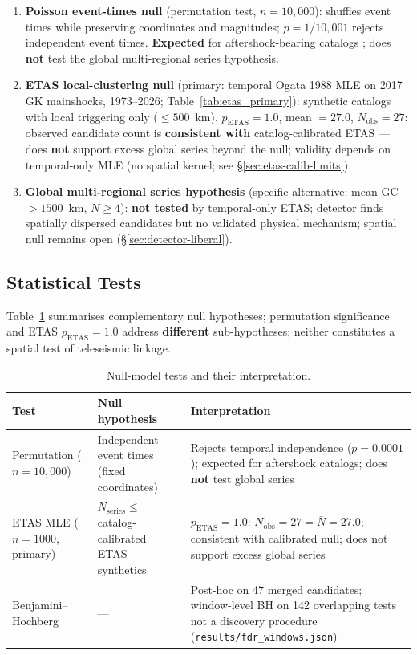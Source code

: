 \documentclass[draft]{agujournal2019}
\begin{document}
\begin{enumerate}
\item \textbf{Poisson event-times null} (permutation test, $n=10{,}000$):
      shuffles event times while preserving coordinates and magnitudes;
      $p = 1/10{,}001$ rejects independent event times.
      \textbf{Expected} for aftershock-bearing catalogs \citep{Ogata1988};
      does \textbf{not} test the global multi-regional series hypothesis.

\item \textbf{ETAS local-clustering null} (primary: temporal Ogata 1988 MLE on
      2017 GK mainshocks, 1973--2026; Table~\ref{tab:etas_primary}):
      synthetic catalogs with local triggering only ($\le 500$~km).
      $p_\mathrm{ETAS}=1.0$, mean $= 27.0$, $N_\mathrm{obs}=27$:
      observed candidate count is \textbf{consistent with} catalog-calibrated
      ETAS --- does \textbf{not} support excess global series beyond the null;
      validity depends on temporal-only MLE (no spatial kernel; see
      \S\ref{sec:etas-calib-limits}).

\item \textbf{Global multi-regional series hypothesis} (specific alternative:
      mean GC $> 1500$~km, $N\ge 4$): \textbf{not tested} by temporal-only ETAS;
      detector finds spatially dispersed candidates but no validated physical
      mechanism; spatial null remains open (§\ref{sec:detector-liberal}).
\end{enumerate}

\subsection{Statistical Tests}
\label{subsec:stat-tests}

Table~\ref{tab:null_tests} summarises complementary null hypotheses;
permutation significance and ETAS $p_\mathrm{ETAS}=1.0$ address \textbf{different}
sub-hypotheses; neither constitutes a spatial test of teleseismic linkage.

\begin{table}[htbp]
\centering
\caption{Null-model tests and their interpretation.}
\label{tab:null_tests}
\begin{tabular}{p{2.2cm}p{4.2cm}p{5.8cm}}
\hline
\textbf{Test} & \textbf{Null hypothesis} & \textbf{Interpretation} \\
\hline
Permutation ($n=10{,}000$) & Independent event times (fixed coordinates) & Rejects temporal independence ($p=0.0001$); expected for aftershock catalogs; does \textbf{not} test global series \\
ETAS MLE ($n=1000$, primary) & $N_\mathrm{series} \le$ catalog-calibrated ETAS synthetics & $p_\mathrm{ETAS}=1.0$: $N_\mathrm{obs}=27 = \bar{N}=27.0$; consistent with calibrated null; does not support excess global series \\
Benjamini--Hochberg & --- & Post-hoc on 47 merged candidates; window-level BH on 142 overlapping tests not a discovery procedure (\texttt{results/fdr\_windows.json}) \\
\hline
\end{tabular}
\end{table}
\end{document}

